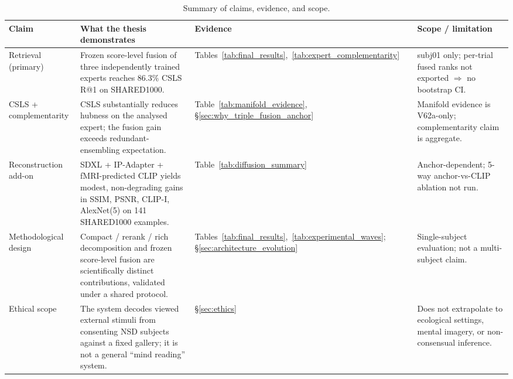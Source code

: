 \begin{table}[htbp]
\centering
\footnotesize
\begin{tabularx}{\textwidth}{@{}>{\raggedright\arraybackslash}p{2.6cm} >{\raggedright\arraybackslash}X >{\raggedright\arraybackslash}p{3.0cm} >{\raggedright\arraybackslash}X@{}}
\toprule
\textbf{Claim} & \textbf{What the thesis demonstrates} & \textbf{Evidence} & \textbf{Scope / limitation} \\
\midrule
Retrieval (primary) & Frozen score-level fusion of three independently trained experts reaches $86.3\%$ CSLS R@1 on SHARED1000. & Tables~\ref{tab:final_results},~\ref{tab:expert_complementarity} & subj01 only; per-trial fused ranks not exported $\Rightarrow$ no bootstrap CI. \\
CSLS + complementarity & CSLS substantially reduces hubness on the analysed expert; the fusion gain exceeds redundant-ensembling expectation. & Table~\ref{tab:manifold_evidence}, \S\ref{sec:why_triple_fusion_anchor} & Manifold evidence is V62a-only; complementarity claim is aggregate. \\
Reconstruction add-on & SDXL + IP-Adapter + fMRI-predicted CLIP yields modest, non-degrading gains in SSIM, PSNR, CLIP-I, AlexNet(5) on 141 SHARED1000 examples. & Table~\ref{tab:diffusion_summary} & Anchor-dependent; 5-way anchor-vs-CLIP ablation not run. \\
Methodological design & Compact / rerank / rich decomposition and frozen score-level fusion are scientifically distinct contributions, validated under a shared protocol. & Tables~\ref{tab:final_results},~\ref{tab:experimental_waves}; \S\ref{sec:architecture_evolution} & Single-subject evaluation; not a multi-subject claim. \\
Ethical scope & The system decodes viewed external stimuli from consenting NSD subjects against a fixed gallery; it is not a general ``mind reading'' system. & \S\ref{sec:ethics} & Does not extrapolate to ecological settings, mental imagery, or non-consensual inference. \\
\bottomrule
\end{tabularx}
\caption{Summary of claims, evidence, and scope.}
\label{tab:defense_summary}
\end{table}
